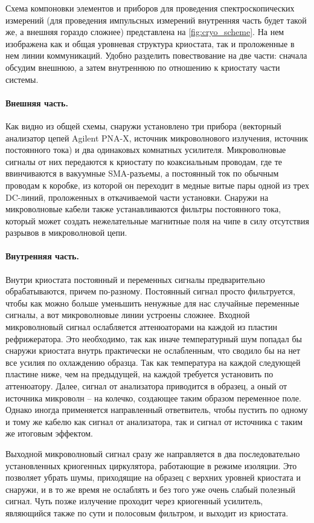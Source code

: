 \documentclass[12pt, twoside]{report}
\numberwithin{equation}{section}
\numberwithin{figure}{section}
\begin{document}
Схема компоновки элементов и приборов для проведения спектроскопических измерений (для проведения импульсных измерений внутренняя часть будет такой же, а внешняя гораздо сложнее) представлена на \autoref{fig:cryo_scheme}. На нем изображена как и общая уровневая структура криостата, так и проложенные в нем линии коммуникаций. Удобно разделить повествование на две части: сначала обсудим внешнюю, а затем внутреннюю по отношению к криостату части системы.

\paragraph{Внешняя часть.} Как видно из общей схемы, снаружи установлено три прибора (векторный анализатор цепей Agilent PNA-X, источник микроволнового излучения, источник постоянного тока) и два одинаковых комнатных усилителя. Микроволновые сигналы от них передаются к криостату по коаксиальным проводам, где те ввинчиваются в вакуумные SMA-разъемы, а постоянный ток по обычным проводам к коробке, из которой он переходит в медные витые пары одной из трех DC-линий, проложенных в откачиваемой части установки. Снаружи на микроволновые кабели также устанавливаются фильтры постоянного тока, который может создать нежелательные магнитные поля на чипе в силу отсутствия разрывов в микроволновой цепи.

\paragraph{Внутренняя часть.} Внутри криостата постоянный и переменных сигналы предварительно обрабатываются, причем по-разному. Постоянный сигнал просто фильтруется, чтобы как можно больше уменьшить ненужные для нас случайные переменные сигналы, а вот микроволновые линии устроены сложнее. Входной микроволновый сигнал ослабляется аттенюаторами на каждой из пластин рефрижератора. Это необходимо, так как иначе температурный шум попадал бы снаружи криостата внутрь практически не ослабленным, что сводило бы на нет все усилия по охлаждению образца. Так как температура на каждой следующей пластине ниже, чем на предыдущей, на каждой требуется установить по аттенюатору. Далее, сигнал от анализатора приводится в образец, а оный от источника микроволн -- на колечко, создающее таким образом переменное поле. Однако иногда применяется направленный ответвитель, чтобы пустить по одному и тому же кабелю как сигнал от анализатора, так и сигнал от источника с таким же итоговым эффектом.

Выходной микроволновый сигнал сразу же направляется в два последовательно установленных криогенных циркулятора, работающие в режиме изоляции. Это позволяет убрать шумы, приходящие на образец с верхних уровней криостата и снаружи, и в то же время не ослаблять и без того уже очень слабый полезный сигнал. Чуть позже излучение проходит  через криогенный усилитель, являющийся также по сути и полосовым фильтром, и выходит из криостата.
\end{document}
